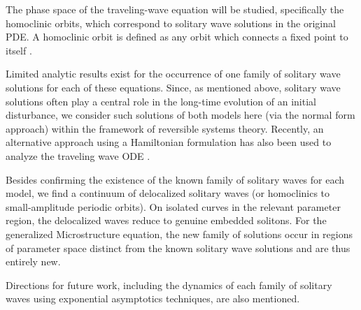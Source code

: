 The phase space of the traveling-wave equation will be studied, specifically 
the homoclinic orbits, which correspond to solitary wave solutions in the original
PDE. A homoclinic orbit is defined as any orbit which connects a fixed point to itself 
\cite{Strogatz}.

Limited analytic results exist for the occurrence of one family
of  solitary wave solutions for each of these equations. Since, as
mentioned above, solitary wave solutions often play a central role in
the long-time evolution of an initial disturbance, we consider
such solutions of both models here (via the normal form approach)
within the framework of reversible systems theory. Recently, an
alternative approach using a Hamiltonian formulation has also
been used to analyze the traveling wave ODE \cite{LiZhang}.

Besides confirming
the existence of the known family of solitary waves for each model,
we find a continuum of delocalized solitary waves
(or homoclinics to small-amplitude periodic orbits).
On isolated curves in the relevant parameter region, the delocalized
waves reduce to genuine embedded solitons.
For the generalized Microstructure equation, the new family of solutions occur in regions of
parameter space distinct from the known solitary wave solutions and
are thus entirely new.

Directions for future work, including the dynamics of each family of
solitary waves using exponential asymptotics techniques, are also mentioned.


